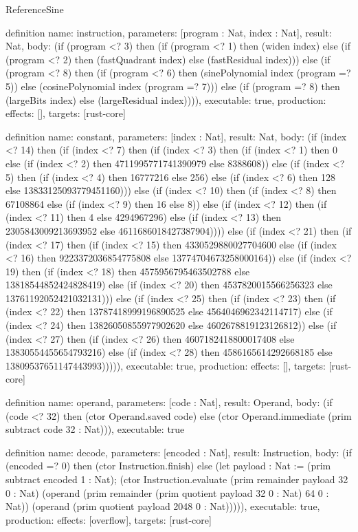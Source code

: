 \begin{lexlean}{ReferenceSine}
\begin{semanticmodule}
definition{
  name: instruction,
  parameters: [program : Nat, index : Nat],
  result: Nat,
  body: (if (program <? 3) then (if (program <? 1) then (widen index) else (if (program <? 2) then (fastQuadrant index) else (fastResidual index))) else (if (program <? 8) then (if (program <? 6) then (sinePolynomial index (program =? 5)) else (cosinePolynomial index (program =? 7))) else (if (program =? 8) then (largeBits index) else (largeResidual index)))),
  executable: true,
  production: {effects: [], targets: [rust-core]}
}

definition{
  name: constant,
  parameters: [index : Nat],
  result: Nat,
  body: (if (index <? 14) then (if (index <? 7) then (if (index <? 3) then (if (index <? 1) then 0 else (if (index <? 2) then 4711995771741390979 else 8388608)) else (if (index <? 5) then (if (index <? 4) then 16777216 else 256) else (if (index <? 6) then 128 else 13833125093779451160))) else (if (index <? 10) then (if (index <? 8) then 67108864 else (if (index <? 9) then 16 else 8)) else (if (index <? 12) then (if (index <? 11) then 4 else 4294967296) else (if (index <? 13) then 2305843009213693952 else 4611686018427387904)))) else (if (index <? 21) then (if (index <? 17) then (if (index <? 15) then 4330529880027704600 else (if (index <? 16) then 9223372036854775808 else 13774704673258000164)) else (if (index <? 19) then (if (index <? 18) then 4575956795463502788 else 13818544852424828419) else (if (index <? 20) then 4537820015566256323 else 13761192052421032131))) else (if (index <? 25) then (if (index <? 23) then (if (index <? 22) then 13787418999196890525 else 4564046962342114717) else (if (index <? 24) then 13826050855977902620 else 4602678819123126812)) else (if (index <? 27) then (if (index <? 26) then 4607182418800017408 else 13830554455654793216) else (if (index <? 28) then 4586165614292668185 else 13809537651147443993))))),
  executable: true,
  production: {effects: [], targets: [rust-core]}
}

definition{
  name: operand,
  parameters: [code : Nat],
  result: Operand,
  body: (if (code <? 32) then (ctor Operand.saved code) else (ctor Operand.immediate (prim subtract code 32 : Nat))),
  executable: true
}

definition{
  name: decode,
  parameters: [encoded : Nat],
  result: Instruction,
  body: (if (encoded =? 0) then (ctor Instruction.finish) else (let payload : Nat := (prim subtract encoded 1 : Nat);
     (ctor Instruction.evaluate (prim remainder payload 32 0 : Nat) (operand (prim remainder (prim quotient payload 32 0 : Nat) 64 0 : Nat)) (operand (prim quotient payload 2048 0 : Nat))))),
  executable: true,
  production: {effects: [overflow], targets: [rust-core]}
}


\end{semanticmodule}
\end{lexlean}
